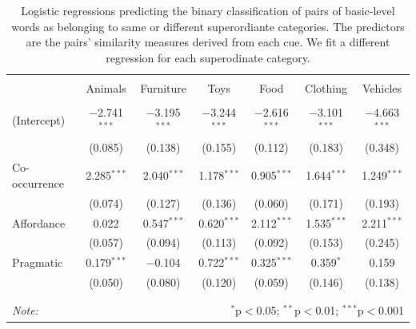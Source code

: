 \documentclass[10pt, letterpaper]{article}
\begin{document}
\begin{table}[t] \centering
  \caption{Logistic regressions predicting the binary classification of pairs of basic-level words as belonging to same or different superordiante categories. The predictors are the pairs' similarity measures derived from each cue. We fit a different regression for each superodinate category.}
  \label{tab:regressions}
\begin{tabular}{@{\extracolsep{5pt}}lcccccc}
\hline
 & \multicolumn{6}{c}{} \\
 & Animals & Furniture & Toys & Food & Clothing & Vehicles \\
\hline \\[-1.8ex]
 (Intercept) & $-$2.741$^{***}$ & $-$3.195$^{***}$ & $-$3.244$^{***}$ & $-$2.616$^{***}$ & $-$3.101$^{***}$ & $-$4.663$^{***}$ \\
  & (0.085) & (0.138) & (0.155) & (0.112) & (0.183) & (0.348) \\
 Co-occurrence & 2.285$^{***}$ & 2.040$^{***}$ & 1.178$^{***}$ & 0.905$^{***}$ & 1.644$^{***}$ & 1.249$^{***}$ \\
  & (0.074) & (0.127) & (0.136) & (0.060) & (0.171) & (0.193) \\
 Affordance & 0.022 & 0.547$^{***}$ & 0.620$^{***}$ & 2.112$^{***}$ & 1.535$^{***}$ & 2.211$^{***}$ \\
  & (0.057) & (0.094) & (0.113) & (0.092) & (0.153) & (0.245) \\
 Pragmatic & 0.179$^{***}$ & $-$0.104 & 0.722$^{***}$ & 0.325$^{***}$ & 0.359$^{*}$ & 0.159 \\
  & (0.050) & (0.080) & (0.120) & (0.059) & (0.146) & (0.138) \\
 \\[-1.8ex]

\hline \\[-1.8ex]
\textit{Note:}  & \multicolumn{6}{r}{$^{*}$p$<$0.05; $^{**}$p$<$0.01; $^{***}$p$<$0.001} \\
\end{tabular}
\end{table}
\end{document}

